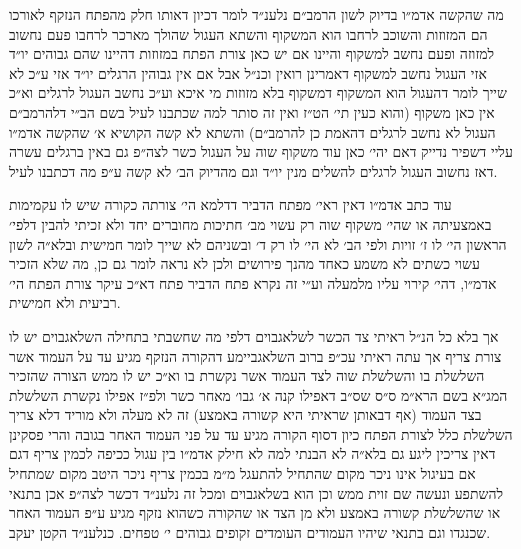 \documentclass[12pt, openany]{book}
\begin{document}
\begin{multicols}{2}
מה שהקשה אדמ״ו בדיוק לשון הרמב״ם נלענ״ד לומר דכיון דאותו חלק מהפתח הנזקף לאורכו הם המזוזות והשוכב לרחבו הוא המשקוף והשתא העגול שהולך מארכר לרחבו פעם נחשוב למזוזה ופעם נחשב למשקוף והיינו אם יש כאן צורת הפתח במזוזות דהיינו שהם גבוהים יו״ד אזי העגול נחשב למשקוף דאמרינן רואין וכנ״ל אבל אם אין גבוהין הרגלים יו״ד אזי ע״כ לא שייך לומר דהעגול הוא המשקוף דמשקוף בלא מזוזות מי איכא וע״כ נחשב העגול לרגלים וא״כ אין כאן משקוף (והוא כעין תי׳ הט״ז ואין זה סותר למה שכתבנו לעיל בשם הב״י דלהרמב״ם העגול לא נחשב לרגלים דהאמת כן להרמב״ם) והשתא לא קשה הקושיא א׳ שהקשה אדמ״ו עליי דשפיר נדייק דאם יהי׳ כאן עוד משקוף שוה על העגול כשר לצה״פ גם באין ברגלים עשרה דאז נחשוב העגול לרגלים להשלים מנין יו״ד וגם מהדיוק הב׳ לא קשה ע״פ מה דכתבנו לעיל.\\\vspace{0pt}

עוד כתב אדמ״ו דאין ראי׳ מפתח הדביר דדלמא הי׳ צורתה כקורה שיש לו עקמימות באמצעיתה או שהי׳ משקוף שוה רק עשוי מב׳ חתיכות מחוברים יחד ולא זכיתי להבין דלפי׳ הראשון הי׳ לו ז׳ זויות ולפי הב׳ לא הי׳ לו רק ד׳ ובשניהם לא שייך לומר חמישית ובלא״ה לשון עשוי כשתים לא משמע כאחד מהנך פירושים ולכן לא נראה לומר גם כן, מה שלא הזכיר אדמ״ו, דהי׳ קירוי עליו מלמעלה וע״י זה נקרא פתח הדביר פתח דא״כ עיקר צורת הפתח הי׳ רביעית ולא חמישית.\\\vspace{0pt}

אך בלא כל הנ״ל ראיתי צד הכשר לשלאגבוים דלפי מה שחשבתי בתחילה השלאגבוים יש לו צורת צריף אך עתה ראיתי עכ״פ ברוב השלאגביימע דהקורה הנזקף מגיע עד על העמוד אשר השלשלת בו והשלשלת שוה לצד העמוד אשר נקשרת בו וא״כ יש לו ממש הצורה שהזכיר המג״א בשם הרא״מ ס״ס שס״ב דאפילו קנה א׳ גבו׳ מאחר כשר ולפ״ז אפילו נקשרת השלשלת בצד העמוד (אף דבאותן שראיתי היא קשורה באמצע) זה לא מעלה ולא מוריד דלא צריך השלשלת כלל לצורת הפתח כיון דסוף הקורה מגיע עד על פני העמוד האחר בגובה והרי פסקינן דאין צריכין ליגע גם בלא״ה לא הבנתי למה לא חילק אדמ״ו בין עגול ככיפה לכמין צריף דגם אם בעיגול אינו ניכר מקום שהתחיל להתעגל מ״מ בכמין צריף ניכר היטב מקום שמתחיל להשתפע ונעשה שם זוית ממש וכן הוא בשלאגבוים ומכל זה נלענ״ד דכשר לצה״פ אכן בתנאי או שהשלשלת קשורה באמצע ולא מן הצד או שהקורה כשהוא נזקף מגיע ע״פ העמוד האחר שכנגדו וגם בתנאי שיהיו העמודים העומדים זקופים גבוהים י׳ טפחים. כנלענ״ד הקטן יעקב.\\\vspace{0pt}

\end{multicols}\newpage
\end{document}
